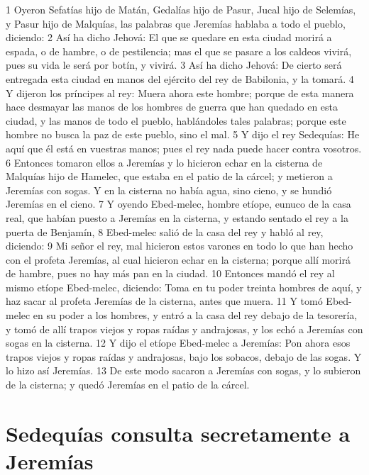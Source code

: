 1 Oyeron Sefatías hijo de Matán, Gedalías hijo de Pasur, Jucal hijo de Selemías, y Pasur hijo de Malquías, las palabras que Jeremías hablaba a todo el pueblo, diciendo:
2 Así ha dicho Jehová: El que se quedare en esta ciudad morirá a espada, o de hambre, o de pestilencia; mas el que se pasare a los caldeos vivirá, pues su vida le será por botín, y vivirá.
3 Así ha dicho Jehová: De cierto será entregada esta ciudad en manos del ejército del rey de Babilonia, y la tomará.
4 Y dijeron los príncipes al rey: Muera ahora este hombre; porque de esta manera hace desmayar las manos de los hombres de guerra que han quedado en esta ciudad, y las manos de todo el pueblo, hablándoles tales palabras; porque este hombre no busca la paz de este pueblo, sino el mal.
5 Y dijo el rey Sedequías: He aquí que él está en vuestras manos; pues el rey nada puede hacer contra vosotros.
6 Entonces tomaron ellos a Jeremías y lo hicieron echar en la cisterna de Malquías hijo de Hamelec, que estaba en el patio de la cárcel; y metieron a Jeremías con sogas. Y en la cisterna no había agua, sino cieno, y se hundió Jeremías en el cieno.
7 Y oyendo Ebed-melec, hombre etíope, eunuco de la casa real, que habían puesto a Jeremías en la cisterna, y estando sentado el rey a la puerta de Benjamín,
8 Ebed-melec salió de la casa del rey y habló al rey, diciendo:
9 Mi señor el rey, mal hicieron estos varones en todo lo que han hecho con el profeta Jeremías, al cual hicieron echar en la cisterna; porque allí morirá de hambre, pues no hay más pan en la ciudad.
10 Entonces mandó el rey al mismo etíope Ebed-melec, diciendo: Toma en tu poder treinta hombres de aquí, y haz sacar al profeta Jeremías de la cisterna, antes que muera.
11 Y tomó Ebed-melec en su poder a los hombres, y entró a la casa del rey debajo de la tesorería, y tomó de allí trapos viejos y ropas raídas y andrajosas, y los echó a Jeremías con sogas en la cisterna.
12 Y dijo el etíope Ebed-melec a Jeremías: Pon ahora esos trapos viejos y ropas raídas y andrajosas, bajo los sobacos, debajo de las sogas. Y lo hizo así Jeremías.
13 De este modo sacaron a Jeremías con sogas, y lo subieron de la cisterna; y quedó Jeremías en el patio de la cárcel.

\section*{Sedequías consulta secretamente a Jeremías}

